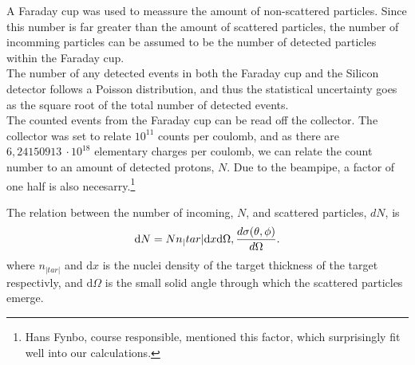 A Faraday cup was used to meassure the amount of non-scattered particles. 
Since this number is far greater than the amount of scattered particles, the
number of incomming particles can be assumed to be the number of detected
particles within the Faraday cup.\\

The number of any detected events in both the Faraday cup and the Silicon
detector follows a Poisson distribution, and thus the statistical uncertainty
goes as the square root of the total number of detected events.\\

The counted events from the Faraday cup can be read off the collector. 
The collector was set to relate $10^{11}$ counts per coulomb, and as there are
$6,24150913\ \cdot10^{18}$ elementary
charges per coulomb, we can relate the count number to an amount of detected
protons, $N$. Due to the beampipe, a factor of one half is also
necesarry.\footnote{Hans Fynbo, course responsible, mentioned this factor,
    which surprisingly fit well into our calculations.}

The relation between the number of incoming, $N$, and scattered particles, $dN$, is
\begin{equation}\label{eq:dN}
    \mathrm{d}N = N n_|tar| \mathrm{d}x \mathrm{d}\Omega,
    \diff[d]{\sigma(\theta,\phi)}{\Omega}.
\end{equation}
\parencite[eq. 14.42, p. 582]{taylor} where $n_|tar|$ and $\mathrm{d}x$ is the
nuclei density of the target thickness of the target respectivly, and
$\mathrm{d}\Omega$ is the small solid angle through which the scattered
particles emerge.

